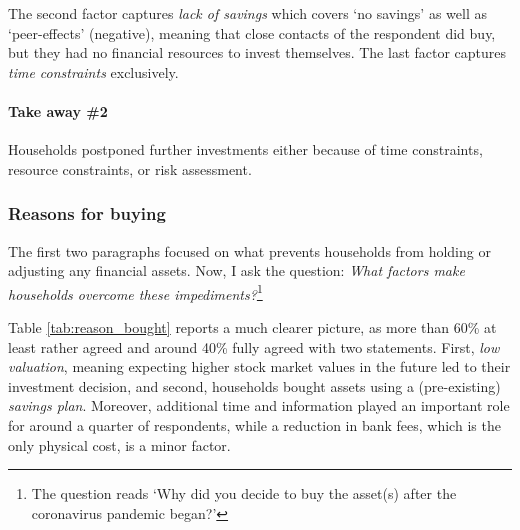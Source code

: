 \documentclass[ProjectABM]{subfiles}
\begin{document}

The second factor captures \textit{lack of savings} which covers `no savings' as well as `peer-effects' (negative), meaning that close contacts of the respondent did buy, but they had no financial resources to invest themselves. The last factor captures \textit{time constraints} exclusively.




\paragraph{Take away \#2}
Households postponed further investments either because of time constraints, resource constraints, or risk assessment.%

\subsubsection{Reasons for buying}
The first two paragraphs focused on what prevents households from holding or adjusting any financial assets. Now, I ask the question: \textit{What factors make households overcome these impediments?}\footnote{The question reads `Why did you decide to buy the asset(s) after the coronavirus pandemic began?'}



Table \ref{tab:reason_bought} reports a much clearer picture, as more than 60\% at least rather agreed and around 40\% fully agreed with two statements. First, \textit{low valuation}, meaning expecting higher stock market values in the future led to their investment decision, and second, households bought assets using a (pre-existing) \textit{savings plan}. %
Moreover, additional time and information played an important role for around a quarter of respondents, while a reduction in bank fees, which is the only physical cost, is a minor factor. %
\end{document}
